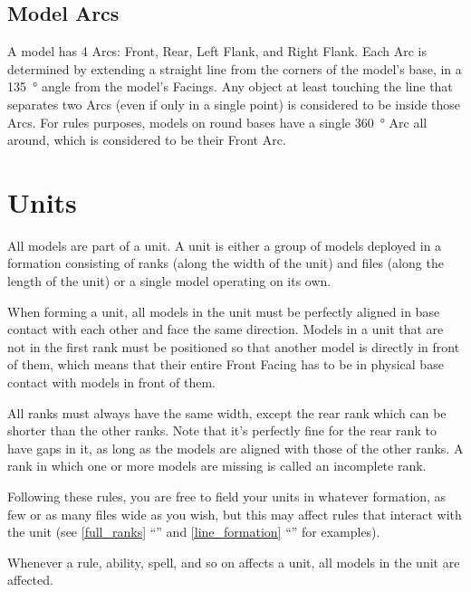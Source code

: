 \subsection{Model Arcs}
\label{model_arcs}

A model has 4 Arcs: Front, Rear, Left Flank, and Right Flank. Each Arc is determined by extending a straight line from the corners of the model's base, in a \SI{135}{\degree} angle from the model's Facings. Any object at least touching the line that separates two Arcs (even if only in a single point) is considered to be inside those Arcs. For rules purposes, models on round bases have a single \SI{360}{\degree} Arc all around, which is considered to be their Front Arc.

\section{Units}
\label{units}

All models are part of a unit. A unit is either a group of models deployed in a formation consisting of ranks (along the width of the unit) and files (along the length of the unit) or a single model operating on its own.

When forming a unit, all models in the unit must be perfectly aligned in base contact with each other and face the same direction. Models in a unit that are not in the first rank must be positioned so that another model is directly in front of them, which means that their entire Front Facing has to be in physical base contact with models in front of them.

\columnbreak

All ranks must always have the same width, except the rear rank which can be shorter than the other ranks. Note that it's perfectly fine for the rear rank to have gaps in it, as long as the models are aligned with those of the other ranks. A rank in which one or more models are missing is called an incomplete rank.

Following these rules, you are free to field your units in whatever formation, as few or as many files wide as you wish, but this may affect rules that interact with the unit (see \ref{full_ranks} \enquote{} and \ref{line_formation} \enquote{} for examples).

Whenever a rule, ability, spell, and so on affects a unit, all models in the unit are affected.

